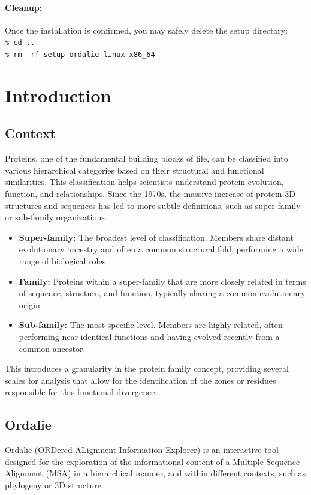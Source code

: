\documentclass[a4paper]{article}
\begin{document}
\paragraph{Cleanup:} Once the installation is confirmed, you may safely delete the setup directory: \\
\texttt{\% cd ..} \\
\texttt{\% rm -rf setup-ordalie-linux-x86\_64}


\newpage
\section{Introduction}

\subsection{Context}
Proteins, one of the fundamental building blocks of life, can be classified into various hierarchical categories based on their structural and functional similarities. This classification helps scientists understand protein evolution, function, and relationships. Since the 1970s, the massive increase of protein 3D structures and sequences has led to more subtle definitions, such as super-family or sub-family organizations.

\begin{itemize}
\item \textbf{Super-family:} The broadest level of classification. Members share distant evolutionary ancestry and often a common structural fold, performing a wide range of biological roles.
\item \textbf{Family:} Proteins within a super-family that are more closely related in terms of sequence, structure, and function, typically sharing a common evolutionary origin.
\item \textbf{Sub-family:} The most specific level. Members are highly related, often performing near-identical functions and having evolved recently from a common ancestor. 
\end{itemize}

This introduces a granularity in the protein family concept, providing several scales for analysis that allow for the identification of the zones or residues responsible for this functional divergence.

\subsection{Ordalie}
Ordalie (ORDered ALignment Information Explorer) is an interactive tool designed for the exploration of the informational content of a Multiple Sequence Alignment (MSA) in a hierarchical manner, and within different contexts, such as phylogeny or 3D structure.
\end{document}
